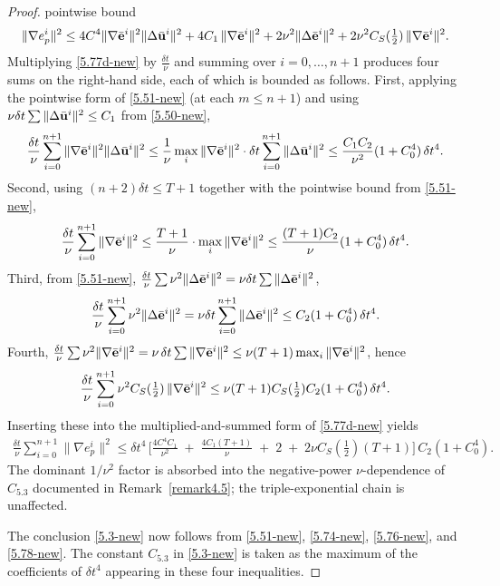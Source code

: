 \documentclass{article}
\theoremstyle{definition}                   %
\begin{document}
\begin{proof}
pointwise bound
\begin{equation}
\|\nabla e^i_p\|^2
\le 4C^4\|\nabla\bar{\bf e}^i\|^2\|\Delta\bar{\bf u}^i\|^2
+ 4 C_1\,\|\nabla\bar{\bf e}^i\|^2
+ 2\nu^2\|\Delta\bar{\bf e}^i\|^2
+ 2\nu^2 C_S(\tfrac12)\,\|\nabla\bar{\bf e}^i\|^2.
\label{5.77d-new}
\end{equation}
Multiplying \eqref{5.77d-new} by $\tfrac{\delta t}{\nu}$ and summing over
$i=0,\dots,n+1$ produces four sums on the right-hand side, each of which is
bounded as follows.
First, applying the pointwise form of \eqref{5.51-new} (at each
$m\le n+1$) and using $\nu\delta t\sum\|\Delta\bar{\bf u}^i\|^2\le C_1$ from \eqref{5.50-new},
\[
\frac{\delta t}{\nu}\sum_{i=0}^{n+1}\|\nabla\bar{\bf e}^i\|^2\|\Delta\bar{\bf u}^i\|^2
\le \frac{1}{\nu}\max_{i}\|\nabla\bar{\bf e}^i\|^2 \cdot \delta t\sum_{i=0}^{n+1}\|\Delta\bar{\bf u}^i\|^2
\le \frac{C_1 C_2}{\nu^2}(1+C_0^4)\,\delta t^4.
\]
Second, using $(n+2)\delta t\le T+1$ together with the
pointwise bound from \eqref{5.51-new},
\[
\frac{\delta t}{\nu}\sum_{i=0}^{n+1}\|\nabla\bar{\bf e}^i\|^2
\le \frac{T+1}{\nu}\cdot \max_{i}\|\nabla\bar{\bf e}^i\|^2
\le \frac{(T+1) C_2}{\nu}(1+C_0^4)\,\delta t^4.
\]
Third, from \eqref{5.51-new}, $\frac{\delta t}{\nu}\sum\nu^2\|\Delta\bar{\bf e}^i\|^2 = \nu\delta t\sum\|\Delta\bar{\bf e}^i\|^2$,
\[
\frac{\delta t}{\nu}\sum_{i=0}^{n+1}\nu^2\|\Delta\bar{\bf e}^i\|^2
= \nu\delta t\sum_{i=0}^{n+1}\|\Delta\bar{\bf e}^i\|^2
\le C_2(1+C_0^4)\,\delta t^4.
\]
Fourth, $\frac{\delta t}{\nu}\sum\nu^2\|\nabla\bar{\bf e}^i\|^2 = \nu\,\delta t\sum\|\nabla\bar{\bf e}^i\|^2 \le \nu(T+1)\max_i\|\nabla\bar{\bf e}^i\|^2$, hence
\[
\frac{\delta t}{\nu}\sum_{i=0}^{n+1}\nu^2 C_S(\tfrac12)\,\|\nabla\bar{\bf e}^i\|^2
\le \nu(T+1) C_S(\tfrac12) C_2(1+C_0^4)\,\delta t^4.
\]
Inserting these into the multiplied-and-summed form of \eqref{5.77d-new}
yields
\begin{align}
\frac{\delta t}{\nu}\sum_{i=0}^{n+1}\|\nabla e^i_p\|^2
\le \delta t^4\,
\Big[
\frac{4 C^4 C_1}{\nu^2} \;+\; \frac{4 C_1 (T+1)}{\nu} \;+\; 2 \;+\; 2\nu C_S(\tfrac12)(T+1)
\Big]\,
C_2(1+C_0^4).
\label{5.78-new}
\end{align}
The dominant $1/\nu^2$ factor is absorbed into the negative-power $\nu$-dependence of $C_{5.3}$ documented in Remark~\ref{remark4.5}; the triple-exponential chain is unaffected.

\medskip
The conclusion \eqref{5.3-new} now follows from \eqref{5.51-new},
\eqref{5.74-new}, \eqref{5.76-new}, and \eqref{5.78-new}. The constant
$C_{5.3}$ in \eqref{5.3-new} is taken as the maximum of the coefficients
of $\delta t^4$ appearing in these four inequalities.

\end{proof}
\end{document}
